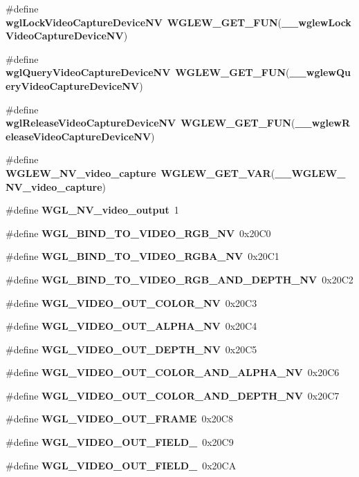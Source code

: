\begin{DoxyCompactItemize}
\item 
\#define {\bf wgl\+Lock\+Video\+Capture\+Device\+NV}~{\bf W\+G\+L\+E\+W\+\_\+\+G\+E\+T\+\_\+\+F\+UN}({\bf \+\_\+\+\_\+wglew\+Lock\+Video\+Capture\+Device\+NV})
\item 
\#define {\bf wgl\+Query\+Video\+Capture\+Device\+NV}~{\bf W\+G\+L\+E\+W\+\_\+\+G\+E\+T\+\_\+\+F\+UN}({\bf \+\_\+\+\_\+wglew\+Query\+Video\+Capture\+Device\+NV})
\item 
\#define {\bf wgl\+Release\+Video\+Capture\+Device\+NV}~{\bf W\+G\+L\+E\+W\+\_\+\+G\+E\+T\+\_\+\+F\+UN}({\bf \+\_\+\+\_\+wglew\+Release\+Video\+Capture\+Device\+NV})
\item 
\#define {\bf W\+G\+L\+E\+W\+\_\+\+N\+V\+\_\+video\+\_\+capture}~{\bf W\+G\+L\+E\+W\+\_\+\+G\+E\+T\+\_\+\+V\+AR}({\bf \+\_\+\+\_\+\+W\+G\+L\+E\+W\+\_\+\+N\+V\+\_\+video\+\_\+capture})
\item 
\#define {\bf W\+G\+L\+\_\+\+N\+V\+\_\+video\+\_\+output}~1
\item 
\#define {\bf W\+G\+L\+\_\+\+B\+I\+N\+D\+\_\+\+T\+O\+\_\+\+V\+I\+D\+E\+O\+\_\+\+R\+G\+B\+\_\+\+NV}~0x20\+C0
\item 
\#define {\bf W\+G\+L\+\_\+\+B\+I\+N\+D\+\_\+\+T\+O\+\_\+\+V\+I\+D\+E\+O\+\_\+\+R\+G\+B\+A\+\_\+\+NV}~0x20\+C1
\item 
\#define {\bf W\+G\+L\+\_\+\+B\+I\+N\+D\+\_\+\+T\+O\+\_\+\+V\+I\+D\+E\+O\+\_\+\+R\+G\+B\+\_\+\+A\+N\+D\+\_\+\+D\+E\+P\+T\+H\+\_\+\+NV}~0x20\+C2
\item 
\#define {\bf W\+G\+L\+\_\+\+V\+I\+D\+E\+O\+\_\+\+O\+U\+T\+\_\+\+C\+O\+L\+O\+R\+\_\+\+NV}~0x20\+C3
\item 
\#define {\bf W\+G\+L\+\_\+\+V\+I\+D\+E\+O\+\_\+\+O\+U\+T\+\_\+\+A\+L\+P\+H\+A\+\_\+\+NV}~0x20\+C4
\item 
\#define {\bf W\+G\+L\+\_\+\+V\+I\+D\+E\+O\+\_\+\+O\+U\+T\+\_\+\+D\+E\+P\+T\+H\+\_\+\+NV}~0x20\+C5
\item 
\#define {\bf W\+G\+L\+\_\+\+V\+I\+D\+E\+O\+\_\+\+O\+U\+T\+\_\+\+C\+O\+L\+O\+R\+\_\+\+A\+N\+D\+\_\+\+A\+L\+P\+H\+A\+\_\+\+NV}~0x20\+C6
\item 
\#define {\bf W\+G\+L\+\_\+\+V\+I\+D\+E\+O\+\_\+\+O\+U\+T\+\_\+\+C\+O\+L\+O\+R\+\_\+\+A\+N\+D\+\_\+\+D\+E\+P\+T\+H\+\_\+\+NV}~0x20\+C7
\item 
\#define {\bf W\+G\+L\+\_\+\+V\+I\+D\+E\+O\+\_\+\+O\+U\+T\+\_\+\+F\+R\+A\+ME}~0x20\+C8
\item 
\#define {\bf W\+G\+L\+\_\+\+V\+I\+D\+E\+O\+\_\+\+O\+U\+T\+\_\+\+F\+I\+E\+L\+D\+\_}~0x20\+C9
\item 
\#define {\bf W\+G\+L\+\_\+\+V\+I\+D\+E\+O\+\_\+\+O\+U\+T\+\_\+\+F\+I\+E\+L\+D\+\_}~0x20\+CA

\end{DoxyCompactItemize}
